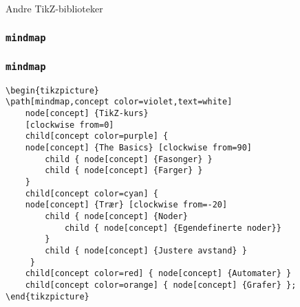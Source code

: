 \documentclass{beamer}
\begin{document}
\begin{frame}[fragile]
\begin{center}
\Huge{Andre TikZ-biblioteker}
\end{center}
\end{frame}

\begin{frame}[fragile]
\frametitle{\texttt{mindmap}}

\begin{center}
\end{center}

\end{frame}

\begin{frame}[fragile]
\frametitle{\texttt{mindmap}}

\begin{Verbatim}[fontsize=\scriptsize, frame=single]
\begin{tikzpicture}
\path[mindmap,concept color=violet,text=white]
    node[concept] {TikZ-kurs}
    [clockwise from=0]
    child[concept color=purple] { 
    node[concept] {The Basics} [clockwise from=90]
        child { node[concept] {Fasonger} }
        child { node[concept] {Farger} }
    }  
    child[concept color=cyan] {
    node[concept] {Trær} [clockwise from=-20]
        child { node[concept] {Noder} 
            child { node[concept] {Egendefinerte noder}}
        }
        child { node[concept] {Justere avstand} }
     }
    child[concept color=red] { node[concept] {Automater} }
    child[concept color=orange] { node[concept] {Grafer} };
\end{tikzpicture}
\end{Verbatim}

\end{frame}
\end{document}
